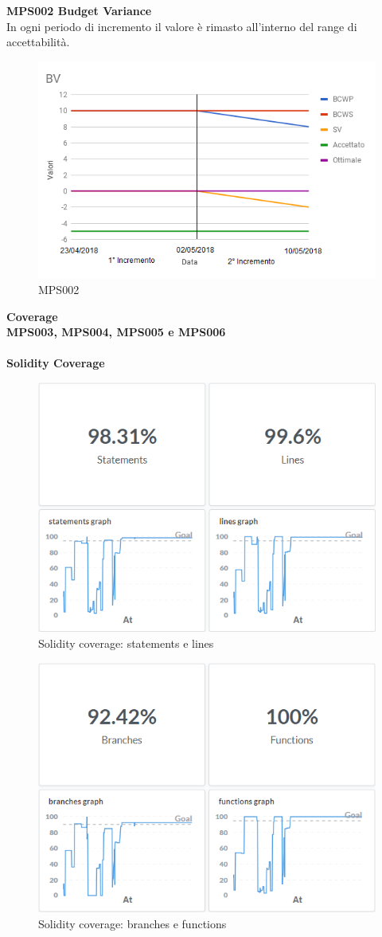 \documentclass[PianoDiQualifica.tex]{subfiles}
\begin{document}
\textbf{MPS002 Budget Variance}\\
In ogni periodo di incremento il valore è rimasto all'interno del range di accettabilità.
\begin{figure}[H]
	\centering
	\includegraphics[width=0.8\linewidth]{RA/BV}
	\caption{MPS002}
	\label{fig:processi}
\end{figure}
\newpage
\textbf{Coverage}
\\
\textbf{MPS003, MPS004, MPS005 e MPS006}
\\\\

\textbf{Solidity Coverage}
\begin{figure}[H]
	\centering
	\includegraphics[width=0.6\linewidth]{RA/SolidityCoverage1}
	\caption{Solidity coverage: statements e lines}
	\label{fig:processi}
\end{figure}
\begin{figure}[H]
	\centering
	\includegraphics[width=0.6\linewidth]{RA/SolidityCoverage2}
	\caption{Solidity coverage: branches e functions}
	\label{fig:processi}
\end{figure}
\newpage
\end{document}
